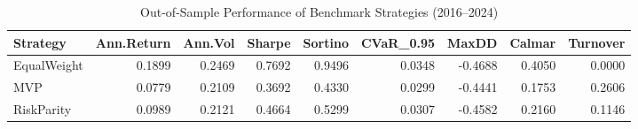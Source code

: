 \begin{table}[htbp]
  \centering
  \caption{Out-of-Sample Performance of Benchmark Strategies (2016--2024)}
  \label{tab:benchmark_results}
  \begin{tabular}{lrrrrrrrr}
    \toprule
    Strategy & Ann.Return & Ann.Vol & Sharpe & Sortino & CVaR_0.95 & MaxDD & Calmar & Turnover \\
    \midrule
    EqualWeight & 0.1899 & 0.2469 & 0.7692 & 0.9496 & 0.0348 & -0.4688 & 0.4050 & 0.0000 \\
    MVP & 0.0779 & 0.2109 & 0.3692 & 0.4330 & 0.0299 & -0.4441 & 0.1753 & 0.2606 \\
    RiskParity & 0.0989 & 0.2121 & 0.4664 & 0.5299 & 0.0307 & -0.4582 & 0.2160 & 0.1146 \\
    \bottomrule
  \end{tabular}
\end{table}
